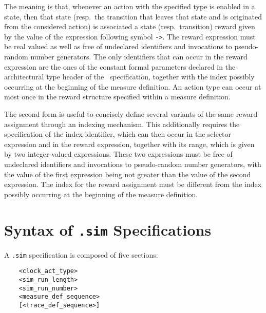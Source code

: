 The meaning is that, whenever an action with the specified type is enabled in a state, then that state
(resp.\ the transition that leaves that state and is originated from the considered action) is associated a
state (resp.\ transition) reward given by the value of the expression following symbol {\tt ->}. The reward
expression must be real valued as well as free of undeclared identifiers and invocations to pseudo-random
number generators. The only identifiers that can occur in the reward expression are the ones of the constant
formal parameters declared in the architectural type header of the \aemilia\ specification, together with
the index possibly occurring at the beginning of the measure definition. An action type can occur at most
once in the reward structure specified within a measure definition.

The second form is useful to concisely define several variants of the same reward assignment through an
indexing mechanism. This additionally requires the specification of the index identifier, which can then
occur in the selector expression and in the reward expression, together with its range, which is given by
two integer-valued expressions. These two expressions must be free of undeclared identifiers and invocations
to pseudo-random number generators, with the value of the first expression being not greater than the value
of the second expression. The index for the reward assignment must be different from the index possibly
occurring at the beginning of the measure definition.



\section{Syntax of {\tt .sim} Specifications}

A {\tt .sim} specification is composed of five sections:

        \begin{verbatim}
    <clock_act_type>
    <sim_run_length>
    <sim_run_number>
    <measure_def_sequence>
    [<trace_def_sequence>]
        \end{verbatim}



